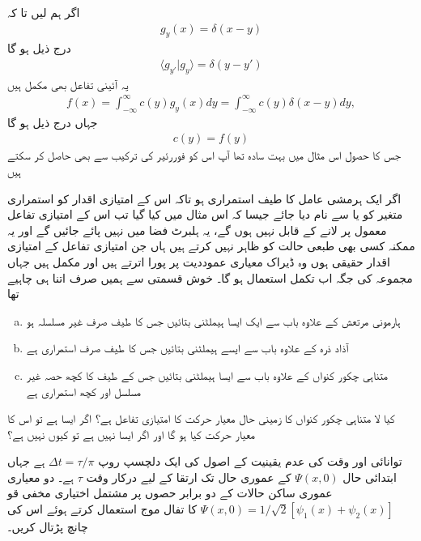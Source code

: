 
اگر ہم  لیں تا کہ
\begin{align}
g_{y}(x) = \delta (x-y)
\end{align}
درج ذیل ہو گا
\begin{align}
\langle g_{y'} | g_{y} \rangle = \delta (y-y')
\end{align}
یہ آئینی تفاعل بھی مکمل ہیں
\begin{align}
f(x) = \int_{-\infty}^{\infty} c(y)g_{y}(x) dy = \int_{-\infty}^{\infty} c(y)\delta(x-y)dy,
\end{align}
جہاں درج ذیل ہو گا
\begin{align}
c(y) = f(y)
\end{align}
جس کا حصول اس مثال میں بہت سادہ تھا آپ اس کو فوررئیر کی ترکیب سے بھی حاصل کر سکتے ہیں

اگر ایک ہرمشی عامل کا طیف استمراری ہو تاکہ اس کے امتیازی اقدار کو استمراری متغیر کو   یا  سے نام دیا جائے جیسا کہ اس مثال میں کیا گیا تب اس کے امتیازی تفاعل معمول پر لانے کے قابل نہیں ہوں گے، یہ ہلبرٹ فضا میں نہیں پائے جائیں گے اور یہ ممکنہ کسی بھی طبعی حالت کو ظاہر نہیں کرتے ہیں ہاں جن امتیازی تفاعل کے امتیازی اقدار حقیقی ہوں وہ ڈیراک معیاری عموددیت پر پورا اترتے ہیں اور مکمل ہیں جہاں مجموعہ کی جگہ اب تکمل استعمال ہو گا۔  خوش قسمتی سے ہمیں صرف اتنا ہی چاہیے تھا
\begin{enumerate}[a.]
\item  ہارمونی مرتعش کے علاوہ باب  سے ایک ایسا ہیملٹنی بتائیں جس کا طیف صرف غیر مسلسلہ ہو 
\item آذاد ذرہ کے علاوہ باب   سے ایسے ہیملٹنی بتائیں جس کا طیف صرف استمراری ہے 
\item متناہی چکور کنواں کے علاوہ باب   سے ایسا ہیملٹنی بتائیں جس کے طیف کا کچھ حصہ غیر مسلسل اور کچھ استمراری ہے 
\end{enumerate}
کیا لا متناہی چکور کنواں کا زمینی حال معیار حرکت کا  امتیازی تفاعل ہے؟ اگر ایسا ہے تو اس کا معیار حرکت کیا ہو گا اور اگر ایسا نہیں ہے تو کیوں نہیں ہے؟

توانائی اور وقت کی عدم یقینیت کے اصول کی ایک دلچسپ روپ
\(\Delta t=\tau/\pi\)
ہے جہاں ابتدائی حال
\(\Psi (x,0)\)
کے عموری حال تک ارتقا کے لیے درکار وقت
\(\tau\)
ہے۔ دو معیاری عموری ساکن حالات کے دو برابر حصوں پر مشتمل اختیاری مخفی قو
\(\Psi(x,0)=1/\sqrt{2}[\psi_{1}(x)+\psi_{2}(x)]\)
کا تفال موج استعمال کرتے ہوئے اس کی چانچ پڑتال کریں۔

